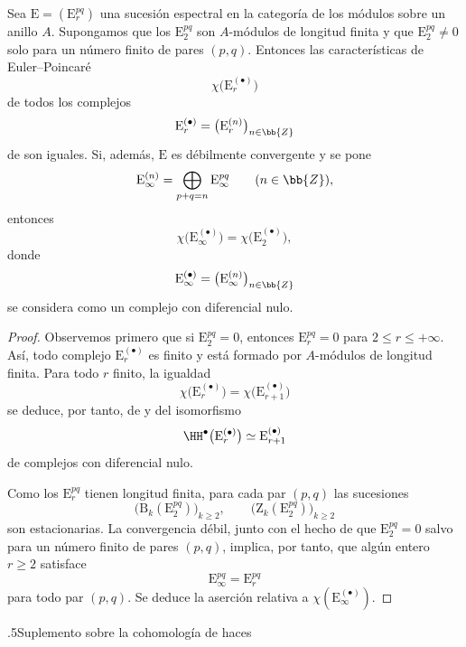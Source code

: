 \documentclass[oneside]{amsart}
\makeatletter
\renewcommand*{\section}{%
  \@startsection{section}{1}{\z@}{.7\linespacing\@plus\linespacing}%
  {.5\linespacing}{\normalfont\bfseries\Large\scshape\centering}}
\renewcommand{\leq}{\leqslant}
\renewcommand{\geq}{\geqslant}
\let\EGAOriginalLabel\label
\renewcommand{\label}[1]{\phantomsection\EGAOriginalLabel{#1}}
\makeatother
\begin{document}
\begin{corollary}[11.10.3]
\label{0.11.10.3}
Sea $\mathrm{E}=(\mathrm{E}_r^{pq})$ una sucesión espectral en la
categoría de los módulos sobre un anillo $A$.
Supongamos que los $\mathrm{E}_2^{pq}$ son $A$-módulos de longitud finita y
que $\mathrm{E}_2^{pq}\neq0$ solo para un número finito de pares $(p,q)$.
Entonces las características de Euler--Poincar\'e
\[
  \chi\bigl(\mathrm{E}_r^{(\bullet)}\bigr)
\]
de todos los complejos
\[
  \mathrm{E}_r^{(\bullet)}
  =
  \bigl(\mathrm{E}_r^{(n)}\bigr)_{n\in\bb{Z}}
\]
de  son iguales.
Si, además, $\mathrm{E}$ es débilmente convergente y se pone
\[
  \mathrm{E}_\infty^{(n)}
  =
  \bigoplus_{p+q=n}\mathrm{E}_\infty^{pq}
  \qquad(n\in\bb{Z}),
\]
entonces
\[
  \chi\bigl(\mathrm{E}_\infty^{(\bullet)}\bigr)
  =
  \chi\bigl(\mathrm{E}_2^{(\bullet)}\bigr),
\]
donde
\[
  \mathrm{E}_\infty^{(\bullet)}
  =
  \bigl(\mathrm{E}_\infty^{(n)}\bigr)_{n\in\bb{Z}}
\]
se considera como un complejo con diferencial nulo.
\end{corollary}

\begin{proof}
Observemos primero que si $\mathrm{E}_2^{pq}=0$, entonces
$\mathrm{E}_r^{pq}=0$ para $2\leq r\leq+\infty$.
Así, todo complejo $\mathrm{E}_r^{(\bullet)}$ es finito y está formado por
$A$-módulos de longitud finita.
Para todo $r$ finito, la igualdad
\[
  \chi\bigl(\mathrm{E}_r^{(\bullet)}\bigr)
  =
  \chi\bigl(\mathrm{E}_{r+1}^{(\bullet)}\bigr)
\]
se deduce, por tanto, de  y del isomorfismo
\[
  \HH^\bullet\bigl(\mathrm{E}_r^{(\bullet)}\bigr)
  \simeq
  \mathrm{E}_{r+1}^{(\bullet)}
\]
de complejos con diferencial nulo.

Como los $\mathrm{E}_r^{pq}$ tienen longitud finita, para cada par
$(p,q)$ las sucesiones
\[
  \bigl(\mathrm{B}_k(\mathrm{E}_2^{pq})\bigr)_{k\geq2},
  \qquad
  \bigl(\mathrm{Z}_k(\mathrm{E}_2^{pq})\bigr)_{k\geq2}
\]
son estacionarias.
La convergencia débil, junto con el hecho de que
$\mathrm{E}_2^{pq}=0$ salvo para un número finito de pares $(p,q)$, implica, por tanto,
que algún entero $r\geq2$ satisface
\[
  \mathrm{E}_\infty^{pq}=\mathrm{E}_r^{pq}
\]
para todo par $(p,q)$.
Se deduce la aserción relativa a
$\chi(\mathrm{E}_\infty^{(\bullet)})$.
\end{proof}

\section{Suplemento sobre la cohomología de haces}
\label{section:0.12}
\end{document}
